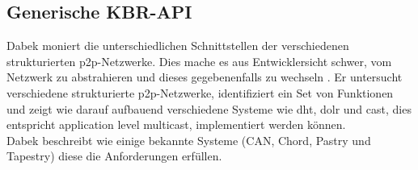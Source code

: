 \subsection*{Generische KBR-API}
\label{chap:evaluation_p2p:generic_api}
Dabek moniert die unterschiedlichen Schnittstellen der verschiedenen strukturierten p2p-Netzwerke. Dies mache es aus Entwicklersicht schwer, vom Netzwerk zu abstrahieren und dieses gegebenenfalls zu wechseln \cite{Dabek2003Towards}. Er untersucht verschiedene strukturierte p2p-Netzwerke, identifiziert ein Set von Funktionen  und zeigt wie darauf aufbauend verschiedene Systeme wie \ac{dht}, \ac{dolr} und \ac{cast}, dies entspricht application level multicast, implementiert werden können.\\
Dabek beschreibt wie einige bekannte Systeme (CAN, Chord, Pastry und Tapestry) diese die Anforderungen erfüllen.

%
